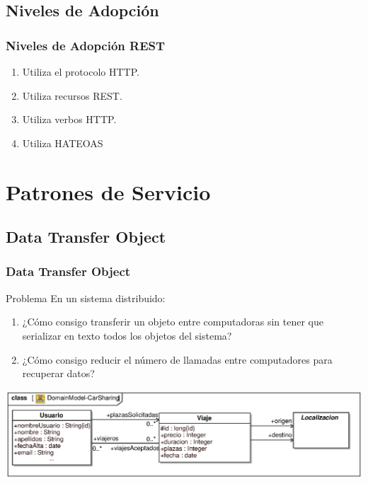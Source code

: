 \documentclass[handout,a4paper,slidestop,xcolor=pst,blue]{beamer}
\begin{document}
\subsection{Niveles de Adopción}

\begin{frame}[c]
    \frametitle{Niveles de Adopción REST}
    \begin{enumerate}[<+->]
        \item Utiliza el protocolo HTTP.
        \item Utiliza recursos REST.
        \item Utiliza verbos HTTP.
        \item Utiliza HATEOAS
    \end{enumerate}
\end{frame}

\section{Patrones de Servicio}

\subsection{Data Transfer Object}

\begin{frame}[c]
    \frametitle{Data Transfer Object}
    \begin{block}{Problema}
        En un sistema distribuido:
        \begin{enumerate}
            \item<2-> ¿Cómo consigo transferir un objeto entre computadoras sin tener que serializar en texto todos los objetos del sistema?
            \item<3-> ¿Cómo consigo reducir el número de llamadas entre computadores para recuperar datos?
        \end{enumerate}
    \end{block}
    \begin{center}
        \includegraphics[width=\linewidth]{images/patterns/dto00.eps}
    \end{center}
\end{frame}
\end{document}
